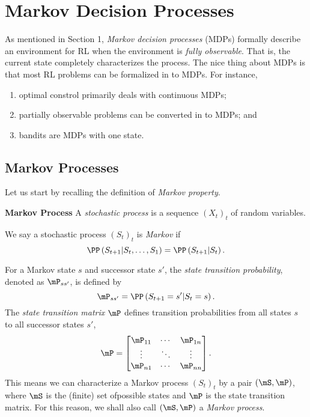 \documentclass[RL]{subfiles}
\begin{document}
    \section{Markov Decision Processes}

    As mentioned in Section 1, \textit{Markov decision processes} (MDPs) formally describe an environment for RL when the environment is \textit{fully observable}. That is, the current state completely characterizes the process. The nice thing about MDPs is that most RL problems can be formalized in to MDPs. For instance,
    \begin{enumerate}
        \item optimal constrol primarily deals with continuous MDPs;
        \item partially observable problems can be converted in to MDPs; and
        \item bandits are MDPs with one state. 
    \end{enumerate}

    \subsection{Markov Processes}

    Let us start by recalling the definition of \textit{Markov property}.

    \begin{recall}{\textbf{Markov Process}}
        A \emph{stochastic process} is a sequence $\left( X_{t} \right)^{}_{t}$ of random variables.

        We say a stochastic process $\left( S_{t} \right)^{}_{t}$ is \emph{Markov} if
        \begin{equation*}
            \PP\left( S_{t+1}|S_t,\ldots,S_1 \right) = \PP\left( S_{t+1}|S_t \right).
        \end{equation*}
    \end{recall}

    \np For a Markov state $s$ and successor state $s'$, the \emph{state transition probability}, denoted as $\mP_{ss'}$, is defined by
    \begin{equation*}
        \mP_{ss'} = \PP\left( S_{t+1}=s' | S_t=s \right).
    \end{equation*}
    The \emph{state transition matrix} $\mP$ defines transition probabilities from all states $s$ to all successor states $s'$,
    \begin{equation*}
        \mP = 
        \begin{bmatrix}
            \mP_{11} & \cdots & \mP_{1n} \\
            \vdots & \ddots & \vdots \\
            \mP_{n1} & \cdots & \mP_{nn} \\
        \end{bmatrix}.
    \end{equation*}
    This means we can characterize a Markov process $\left( S_{t} \right)^{}_{t}$ by a pair $\left( \mS,\mP \right)$, where $\mS$ is the (finite) set ofpossible states and $\mP$ is the state transition matrix. For this reason, we shall also call $\left( \mS,\mP \right)$ a \emph{Markov process}.
\end{document}
